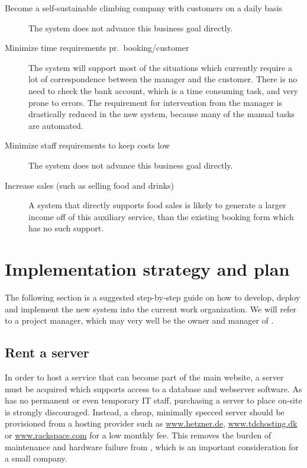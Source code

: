 \begin{description}
    \item[Become a self-sustainable climbing company with customers on a daily
        basis] The system does not advance this business goal directly.

    \item[Minimize time requirements pr.\ booking/customer] The system will
        support most of the situations which currently require a lot of
        correspondence between the manager and the customer. There is
        no need to check the bank account, which is a time consuming task, and
        very prone to errors. The requirement for intervention from the manager
        is drastically reduced in the new system, because many of the manual
        tasks are automated.

    \item[Minimize staff requirements to keep costs low] The system does not
        advance this business goal directly.

    \item[Increase sales (such as selling food and drinks)] A system that
        directly supports food sales is likely to generate a larger income off
        of this auxiliary service, than the existing booking form which has no
        such support.
\end{description}

\newpage
\section{Implementation strategy and plan}
The following section is a suggested step-by-step guide on how to develop, 
deploy and implement the new system into the current work organization. We 
will refer to a project manager, which may very well be the owner and 
manager of \gomonkey{}.

\subsection{Rent a server}
In order to host a service that can become part of the main website, a server
must be acquired which supports access to a database and webserver software. As
\gomonkey{} has no permanent or even temporary IT staff, purchasing a server to
place on-site is strongly discouraged. Instead, a cheap, minimally specced server 
should be provisioned from a hosting provider such as \url{www.hetzner.de}, 
\url{www.tdchosting.dk} or \url{www.rackspace.com} for a low monthly fee. This
removes the burden of maintenance and hardware failure from \gomonkey{}, which
is an important consideration for a small company.

